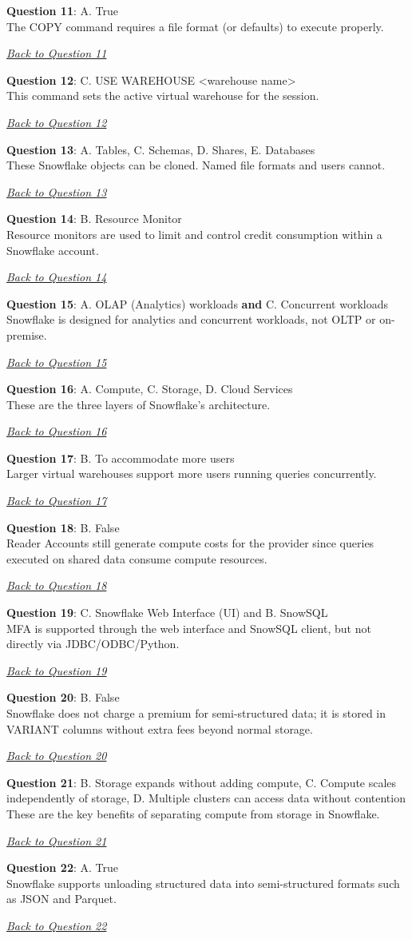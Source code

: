 \documentclass[12pt]{article}
\newcommand{\answer}[2]{%
  \textbf{Question #1}\label{ans:#1}: #2\par
  \smallskip\emph{\hyperref[q:#1]{Back to Question #1}}\par\medskip
}
\begin{document}
\answer{11}{A. True\\
The COPY command requires a file format (or defaults) to execute properly.}

\answer{12}{C. USE WAREHOUSE \textless warehouse name\textgreater\\
This command sets the active virtual warehouse for the session.}

\answer{13}{A. Tables, C. Schemas, D. Shares, E. Databases\\
These Snowflake objects can be cloned. Named file formats and users cannot.}

\answer{14}{B. Resource Monitor\\
Resource monitors are used to limit and control credit consumption within a Snowflake account.}

\answer{15}{A. OLAP (Analytics) workloads \textbf{and} C. Concurrent workloads\\
Snowflake is designed for analytics and concurrent workloads, not OLTP or on-premise.}

\answer{16}{A. Compute, C. Storage, D. Cloud Services\\
These are the three layers of Snowflake’s architecture.}

\answer{17}{B. To accommodate more users\\
Larger virtual warehouses support more users running queries concurrently.}

\answer{18}{B. False\\
Reader Accounts still generate compute costs for the provider since queries executed on shared data consume compute resources.}

\answer{19}{C. Snowflake Web Interface (UI) and B. SnowSQL\\
MFA is supported through the web interface and SnowSQL client, but not directly via JDBC/ODBC/Python.}

\answer{20}{B. False\\
Snowflake does not charge a premium for semi-structured data; it is stored in VARIANT columns without extra fees beyond normal storage.}

\answer{21}{B. Storage expands without adding compute, C. Compute scales independently of storage, D. Multiple clusters can access data without contention\\
These are the key benefits of separating compute from storage in Snowflake.}

\answer{22}{A. True\\
Snowflake supports unloading structured data into semi-structured formats such as JSON and Parquet.}
\end{document}
